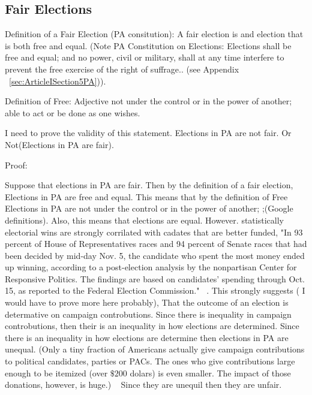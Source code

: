 \documentclass[11pt]{article} %
\begin{document}
\begin{enumerate}
\subsection{Fair Elections}

Definition of a Fair Election (PA consitution):  A fair election is and election that is both free and equal.   (Note PA Constitution on Elections: Elections shall be free and equal; and no power, civil or military, shall at any time interfere to prevent the free exercise of the right of suffrage.. (see Appendix ~\ref{sec:ArticleISection5PA})). 

Definition of Free: Adjective not under the control or in the power of another; able to act or be done as one wishes.

I need to prove the validity of this statement.  Elections in PA are not fair. Or Not(Elections in PA are fair).

Proof: 
%

Suppose that elections in PA are fair. Then  by the definition of a fair election, Elections in PA are free and equal. This means that by the definition of Free Elections in PA are not under the control or in the power of another; ;(Google definitions).   Also, this means that elections are equal.  However. statistically electorial wins are strongly corrilated with cadates that are better funded, "In 93 percent of House of Representatives races and 94 percent of Senate races that had been decided by mid-day Nov. 5, the candidate who spent the most money ended up winning, according to a post-election analysis by the nonpartisan Center for Responsive Politics. The findings are based on candidates' spending through Oct. 15, as reported to the Federal Election Commission." ~\cite{OpenSecretsWins}.  This strongly suggests ( I would have to prove more here probably), That the outcome of an election is determative on campaign controbutions.  Since there is inequality in campaign controbutions, then their is an inequality in how elections are determined. Since there is an inequality in how elections are determine then elections in PA are unequal.    (Only a tiny fraction of Americans actually give campaign contributions to political candidates, parties or PACs. The ones who give contributions large enough to be itemized (over $\$200$ dolars) is even smaller. The impact of those donations, however, is huge.) ~\cite{OpenSecretsDemographics13}  Since they are unequil then they are unfair. 





\end{enumerate}
\end{document}
